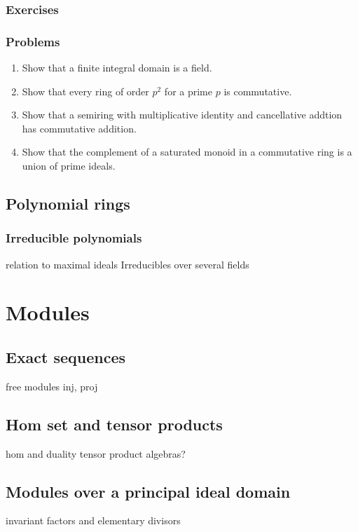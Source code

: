 \documentclass{../note}
\begin{document}
\section*{Exercises}
\section*{Problems}
\begin{enumerate}
\item Show that a finite integral domain is a field.
\item Show that every ring of order $p^2$ for a prime $p$ is commutative.
\item Show that a semiring with multiplicative identity and cancellative addtion has commutative addition.
\item Show that the complement of a saturated monoid in a commutative ring is a union of prime ideals.
\end{enumerate}


\chapter{Polynomial rings}
\section{Irreducible polynomials}
relation to maximal ideals
Irreducibles over several fields













\part{Modules}

\chapter{Exact sequences}
free modules
inj, proj

\chapter{Hom set and tensor products}
hom and duality
tensor product
algebras?

\chapter{Modules over a principal ideal domain}
invariant factors and elementary divisors
\end{document}
